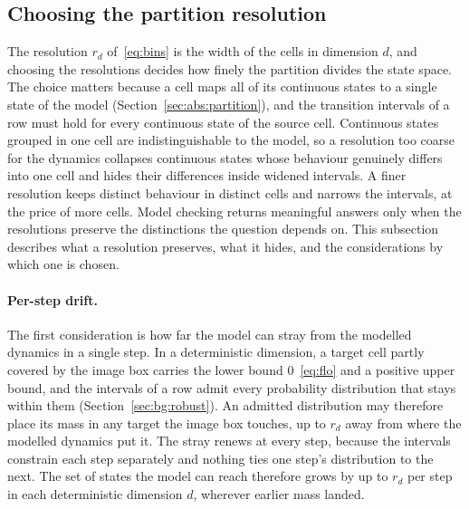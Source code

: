 \documentclass[11pt,a4paper]{article}
\theoremstyle{plain}
\theoremstyle{remark}
\begin{document}
	\subsection{Choosing the partition resolution}
	\label{sec:abs:budget}
	
	The resolution $r_d$ of~\eqref{eq:bins} is the width of the cells in
	dimension $d$, and choosing the resolutions decides how finely the
	partition divides the state space. The choice matters because a cell
	maps all of its continuous states to a single state of the model
	(Section~\ref{sec:abs:partition}), and the transition intervals of a
	row must hold for every continuous state of the source cell.
	Continuous states grouped in one cell are indistinguishable to the
	model, so a resolution too coarse for the dynamics collapses
	continuous states whose behaviour genuinely differs into one cell
	and hides their differences inside widened intervals. A finer
	resolution keeps distinct behaviour in distinct cells and narrows
	the intervals, at the price of more cells. Model checking returns
	meaningful answers only when the resolutions preserve the
	distinctions the question depends on. This subsection describes
	what a resolution preserves, what it hides, and the considerations
	by which one is chosen.
	
	\paragraph{Per-step drift.}
	The first consideration is how far the model can stray from the
	modelled dynamics in a single step. In a deterministic dimension, a
	target cell partly covered by the image box carries the lower bound
	$0$~\eqref{eq:flo} and a positive upper bound, and the intervals of
	a row admit every probability distribution that stays within them
	(Section~\ref{sec:bg:robust}). An admitted distribution may
	therefore place its mass in any target the image box touches, up to
	$r_d$ away from where the modelled dynamics put it. The stray
	renews at every step, because the intervals constrain each step
	separately and nothing ties one step's distribution to the next.
	The set of states the model can reach therefore grows by up to
	$r_d$ per step in each deterministic dimension $d$, wherever
	earlier mass landed.
	
\end{document}
